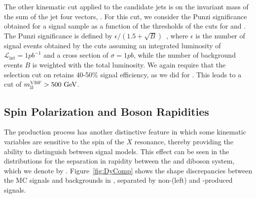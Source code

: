 The other kinematic cut applied to the \VBF candidate jets is on the invariant mass of the sum of the \VBF jet four vectors, \mjjVBF.
For this cut, we consider the Punzi significance obtained for a \VBF signal sample as a function of the thresholds of the cuts for \DetaVBF and \mjjVBF.
The Punzi significance is defined by $\epsilon/(1.5+\sqrt{B})$~\cite{Punzi:2003bu}, where $\epsilon$ is the number of signal events obtained by the cuts assuming an integrated luminosity of $\mathcal{L}_\mathrm{int}=1\unit{pb^{-1}}$ and a cross section of $\sigma=1\unit{pb}$, while the number of background events $B$ is weighted with the total luminosity.
We again require that the selection cut on \mjjVBF retains 40-50\% signal efficiency, as we did for \DetaVBF.
This leads to a cut of $\mjjVBF>500\unit{GeV}$.


\subsection{Spin Polarization and Boson Rapidities}
\label{subsec:spinPol}

The \VBF production process has another distinctive feature in which some kinematic variables are sensitive to the spin of the $X$ resonance, thereby providing the ability to distinguish between signal models.
This effect can be seen in the distributions for the separation in rapidity between the \Vhad and \Wlep diboson system, which we denote by \Dy.
Figure~\ref{fig:DyComp} shows the shape discrepancies between the MC signals and backgrounds in \Dy, separated by non-\VBF (left) and \VBF-produced signals.

